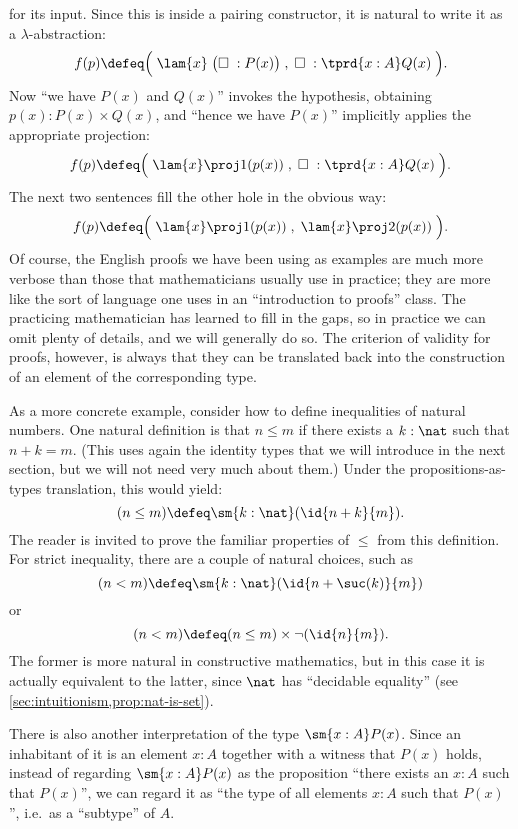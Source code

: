 %
for its input.
Since this is inside a pairing constructor, it is natural to write it as a $\lambda$-abstraction:
\[ f(p) \defeq \Big( \; \lam{x} \;\big(\Box\; : P(x)\big) \;,\; \Box\; : \tprd{x:A}Q(x) \;\Big). \]
Now ``we have $P(x)$ and $Q(x)$'' invokes the hypothesis, obtaining $p(x) : P(x)\times Q(x)$, and ``hence we have $P(x)$'' implicitly applies the appropriate projection:
\[ f(p) \defeq \Big( \; \lam{x} \proj1(p(x))  \;,\; \Box\; : \tprd{x:A}Q(x) \;\Big). \]
The next two sentences fill the other hole in the obvious way:
\[ f(p) \defeq \Big( \; \lam{x} \proj1(p(x))  \;,\; \lam{x} \proj2(p(x)) \; \Big). \]
Of course, the English proofs we have been using as examples are much more verbose than those that mathematicians usually use in practice; they are more like the sort of language one uses in an ``introduction to proofs'' class.
The practicing mathematician has learned to fill in the gaps, so in practice we can omit plenty of details, and we will generally do so.
The criterion of validity for proofs, however, is always that they can be translated back into the construction of an element of the corresponding type.

%
As a more concrete example, consider how to define inequalities of natural numbers.
One natural definition is that $n\le m$ if there exists a $k:\nat$ such that $n+k=m$.
(This uses again the identity types that we will introduce in the next section, but we will not need very much about them.)
Under the propositions-as-types translation, this would yield:
\[ (n\le m) \defeq \sm{k:\nat} (\id{n+k}{m}). \]
The reader is invited to prove the familiar properties of $\le$ from this definition.
For strict inequality, there are a couple of natural choices, such as
\[ (n<m) \defeq \sm{k:\nat} (\id{n+\suc(k)}{m}) \]
or
\[ (n<m) \defeq (n\le m) \times \neg(\id{n}{m}). \]
The former is more natural in constructive mathematics, but in this case it is actually equivalent to the latter, since $\nat$ has ``decidable equality'' (see \cref{sec:intuitionism,prop:nat-is-set}).
%

There is also another interpretation of the type $\sm{x:A} P(x)$.
Since an inhabitant of it is an element $x:A$ together with a witness that $P(x)$ holds, instead of regarding $\sm{x:A} P(x)$ as the proposition ``there exists an $x:A$ such that $P(x)$'', we can regard it as ``the type of all elements $x:A$ such that $P(x)$'', i.e.\ as a ``subtype'' of $A$.
%

